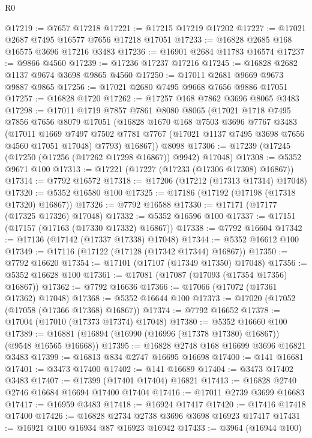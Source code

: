 \begin{lexlean}{R0}
\begin{coremodule}
@17219 := @7657 @17218
@17221 := @17215 @17219 @17202
@17227 := @17021 @2687 @7495 @16577 @7656 @17218 @17051
@17233 := @16828 @2685 @168 @16575 @3696 @17216 @3483
@17236 := @16901 @2684 @11783 @16574
@17237 := @9866 @4560
@17239 := @17236 @17237 @17216
@17245 := @16828 @2682 @1137 @9674 @3698 @9865 @4560
@17250 := @17011 @2681 @9669 @9673 @9887 @9865
@17256 := @17021 @2680 @7495 @9668 @7656 @9886 @17051
@17257 := @16828 @1720
@17262 := @17257 @168 @7862 @3696 @8065 @3483
@17298 := @17011
    @1719
    @7857
    @7861
    @8080
    @8065
    (@17021
      @1718
      @7495
      @7856
      @7656
      @8079
      @17051
      (@16828
        @1670
        @168
        @7503
        @3696
        @7767
        @3483
        (@17011
          @1669
          @7497
          @7502
          @7781
          @7767
          (@17021 @1137 @7495 @3698 @7656 @4560 @17051 @17048)
          @7793)
        @16867))
    @8098
@17306 := @17239 (@17245 (@17250 (@17256 (@17262 @17298 @16867)) @9942) @17048)
@17308 := @5352 @9671 @100
@17313 := @17221 (@17227 (@17233 (@17306 @17308) @16867))
@17314 := @7792 @16572
@17318 := @17206 (@17212 (@17313 @17314) @17048)
@17320 := @5352 @16580 @100
@17325 := @17186 (@17192 (@17198 (@17318 @17320) @16867))
@17326 := @7792 @16588
@17330 := @17171 (@17177 (@17325 @17326) @17048)
@17332 := @5352 @16596 @100
@17337 := @17151 (@17157 (@17163 (@17330 @17332) @16867))
@17338 := @7792 @16604
@17342 := @17136 (@17142 (@17337 @17338) @17048)
@17344 := @5352 @16612 @100
@17349 := @17116 (@17122 (@17128 (@17342 @17344) @16867))
@17350 := @7792 @16620
@17354 := @17101 (@17107 (@17349 @17350) @17048)
@17356 := @5352 @16628 @100
@17361 := @17081 (@17087 (@17093 (@17354 @17356) @16867))
@17362 := @7792 @16636
@17366 := @17066 (@17072 (@17361 @17362) @17048)
@17368 := @5352 @16644 @100
@17373 := @17020 (@17052 (@17058 (@17366 @17368) @16867))
@17374 := @7792 @16652
@17378 := @17004 (@17010 (@17373 @17374) @17048)
@17380 := @5352 @16660 @100
@17389 := @16881 (@16894 (@16990 (@16996 (@17378 @17380) @16867)) (@9548 @16565 @16668))
@17395 := @16828 @2748 @168 @16699 @3696 @16821 @3483
@17399 := @16813 @834 @2747 @16695 @16698
@17400 := @141 @16681
@17401 := @3473 @17400
@17402 := @141 @16689
@17404 := @3473 @17402 @3483
@17407 := @17399 (@17401 @17404) @16821
@17413 := @16828 @2740 @2746 @16684 @16694 @17400 @17404
@17416 := @17011 @2739 @3699 @16683
@17417 := @16959 @3483
@17418 := @16924 @17417
@17420 := @17416 @17418 @17400
@17426 := @16828 @2734 @2738 @3696 @3698 @16923 @17417
@17431 := @16921 @100 @16934 @87 @16923 @16942
@17433 := @3964 (@16944 @100)

\end{coremodule}
\end{lexlean}
